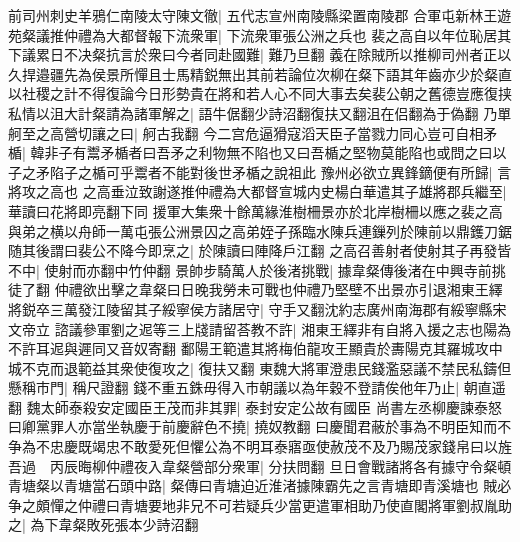 前司州刺史羊鴉仁南陵太守陳文徹|{
	五代志宣州南陵縣梁置南陵郡}
合軍屯新林王遊苑粲議推仲禮為大都督報下流衆軍|{
	下流衆軍張公洲之兵也}
裴之高自以年位恥居其下議累日不决粲抗言於衆曰今者同赴國難|{
	難乃旦翻}
義在除賊所以推柳司州者正以久捍邉疆先為侯景所憚且士馬精鋭無出其前若論位次柳在粲下語其年齒亦少於粲直以社稷之計不得復論今日形勢貴在將和若人心不同大事去矣裴公朝之舊德豈應復挟私情以沮大計粲請為諸軍解之|{
	語牛倨翻少詩沼翻復扶又翻沮在侣翻為于偽翻}
乃單舸至之高營切讓之曰|{
	舸古我翻}
今二宫危逼猾寇滔天臣子當戮力同心豈可自相矛楯|{
	韓非子有鬻矛楯者曰吾矛之利物無不陷也又曰吾楯之堅物莫能陷也或問之曰以子之矛陷子之楯可乎鬻者不能對後世矛楯之說祖此}
豫州必欲立異鋒鏑便有所歸|{
	言將攻之高也}
之高垂泣致謝遂推仲禮為大都督宣城内史楊白華遣其子雄將郡兵繼至|{
	華讀曰花將即亮翻下同}
援軍大集衆十餘萬緣淮樹柵景亦於北岸樹柵以應之裴之高與弟之横以舟師一萬屯張公洲景囚之高弟姪子孫臨水陳兵連鏁列於陳前以鼎鑊刀鋸随其後謂曰裴公不降今即烹之|{
	於陳讀曰陣降戶江翻}
之高召善射者使射其子再發皆不中|{
	使射而亦翻中竹仲翻}
景帥步騎萬人於後渚挑戰|{
	據韋粲傳後渚在中興寺前挑徒了翻}
仲禮欲出擊之韋粲曰日晚我勞未可戰也仲禮乃堅壁不出景亦引退湘東王繹將鋭卒三萬發江陵留其子綏寧侯方諸居守|{
	守手又翻沈約志廣州南海郡有綏寧縣宋文帝立}
諮議參軍劉之迡等三上牋請留荅教不許|{
	湘東王繹非有自將入援之志也陽為不許耳迡與遲同又音奴寄翻}
鄱陽王範遣其將梅伯龍攻王顯貴於夀陽克其羅城攻中城不克而退範益其衆使復攻之|{
	復扶又翻}
東魏大將軍澄患民錢濫惡議不禁民私鑄但懸稱市門|{
	稱尺證翻}
錢不重五銖毋得入市朝議以為年穀不登請俟他年乃止|{
	朝直遥翻}
魏太師泰殺安定國臣王茂而非其罪|{
	泰封安定公故有國臣}
尚書左丞柳慶諫泰怒曰卿黨罪人亦當坐執慶于前慶辭色不撓|{
	撓奴教翻}
曰慶聞君蔽於事為不明臣知而不争為不忠慶既竭忠不敢愛死但懼公為不明耳泰寤亟使赦茂不及乃賜茂家錢帛曰以旌吾過　丙辰晦柳仲禮夜入韋粲營部分衆軍|{
	分扶問翻}
旦日會戰諸將各有據守令粲頓青塘粲以青塘當石頭中路|{
	粲傳曰青塘迫近淮渚據陳霸先之言青塘即青溪塘也}
賊必争之頗憚之仲禮曰青塘要地非兄不可若疑兵少當更遣軍相助乃使直閣將軍劉叔胤助之|{
	為下韋粲敗死張本少詩沼翻}


